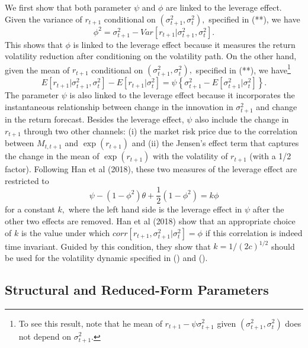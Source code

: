\documentclass[11pt]{article}
\begin{document}
We first show that both parameter $\psi $ and $\phi $ are linked to the
leverage effect. Given the variance of $r_{t+1}$ conditional on $(\sigma
_{t+1}^{2},\sigma _{t}^{2}),$ specified in (**), we have%
\begin{equation*}
\phi ^{2}=\sigma _{t+1}^{2}-Var[r_{t+1}|\sigma _{t+1}^{2},\sigma _{t}^{2}].
\end{equation*}%
This shows that $\phi $ is linked to the leverage effect because it measures
the return volatility reduction after conditioning on the volatility path.
On the other hand, given the mean of $r_{t+1}$ conditional on $(\sigma
_{t+1}^{2},\sigma _{t}^{2}),$ specified in (**), we have\footnote{%
To see this result, note that he mean of $r_{t+1}-\psi \sigma _{t+1}^{2}$
given $(\sigma _{t+1}^{2},\sigma _{t}^{2})$ does not depend on $\sigma
_{t+1}^{2}.$}%
\begin{equation}
E[r_{t+1}|\sigma _{t+1}^{2},\sigma _{t}^{2}]-E[r_{t+1}|\sigma _{t}^{2}]=\psi
\left \{ \sigma _{t+1}^{2}-E[\sigma _{t+1}^{2}|\sigma _{t}^{2}]\right \} .
\end{equation}%
The parameter $\psi $ is also linked to the leverage effect because it
incorporates the instantaneous relationship between change in the innovation
in $\sigma _{t+1}^{2}$ and change in the return forecast. Besides the
leverage effect, $\psi $ also include the change in $r_{t+1}$ through two
other channels: (i) the market risk price due to the correlation between $%
M_{t,t+1}$ and $\exp (r_{t+1})$ and (ii) the Jensen's effect term that
captures the change in the mean of $\exp (r_{t+1})$ with the volatility of $%
r_{t+1}$ (with a 1/2 factor). Following Han et al (2018), these two measures
of the leverage effect are restricted to 
\begin{equation}
\psi -(1-\phi ^{2})\theta +\frac{1}{2}(1-\phi ^{2})=k\phi 
\label{leverage restriction}
\end{equation}%
for a constant $k,$ where the left hand side is the leverage effect in $\psi 
$ after the other two effects are removed. Han et al (2018) show that an
appropriate choice of $k$ is the value under which $corr[r_{t+1},\sigma
_{t+1}^{2}|\sigma _{t}^{2}]=\phi $ if this correlation is indeed time
invariant. Guided by this condition, they show that $k=1/(2c)^{1/2}$ should
be used for the volatility dynamic specified in () and ().

\subsection{Structural and Reduced-Form Parameters}
\end{document}
